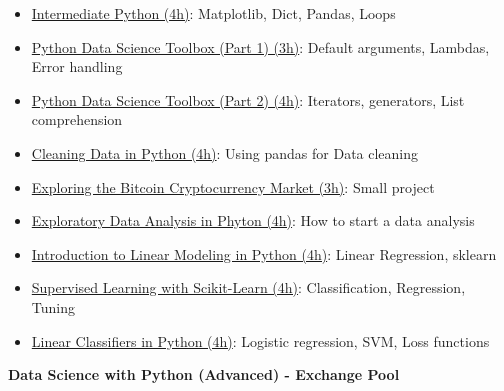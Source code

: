 \documentclass[
  11pt,
]{book}
\providecommand{\tightlist}{%
  \setlength{\itemsep}{0pt}\setlength{\parskip}{0pt}}
\begin{document}
\begin{tipsp}
\begin{itemize}
\tightlist
\item
  \href{https://www.datacamp.com/courses/intermediate-python-for-data-science}{Intermediate
  Python (4h)}: Matplotlib, Dict, Pandas, Loops
\item
  \href{https://www.datacamp.com/courses/python-data-science-toolbox-part-1}{Python
  Data Science Toolbox (Part 1) (3h)}: Default arguments, Lambdas, Error
  handling
\item
  \href{https://www.datacamp.com/courses/python-data-science-toolbox-part-2}{Python
  Data Science Toolbox (Part 2) (4h)}: Iterators, generators, List
  comprehension
\item
  \href{https://www.datacamp.com/courses/cleaning-data-in-python}{Cleaning
  Data in Python (4h)}: Using pandas for Data cleaning
\item
  \href{https://www.datacamp.com/projects/82}{Exploring the Bitcoin
  Cryptocurrency Market (3h)}: Small project
\item
  \href{https://www.datacamp.com/courses/exploratory-data-analysis-in-python}{Exploratory
  Data Analysis in Phyton (4h)}: How to start a data analysis
\item
  \href{https://www.datacamp.com/courses/introduction-to-linear-modeling-in-python}{Introduction
  to Linear Modeling in Python (4h)}: Linear Regression, sklearn
\item
  \href{https://www.datacamp.com/courses/supervised-learning-with-scikit-learn}{Supervised
  Learning with Scikit-Learn (4h)}: Classification, Regression, Tuning
\item
  \href{https://www.datacamp.com/courses/linear-classifiers-in-python}{Linear
  Classifiers in Python (4h)}: Logistic regression, SVM, Loss functions
\end{itemize}

\textbf{Data Science with Python (Advanced) - Exchange Pool}


\end{tipsp}
\end{document}
